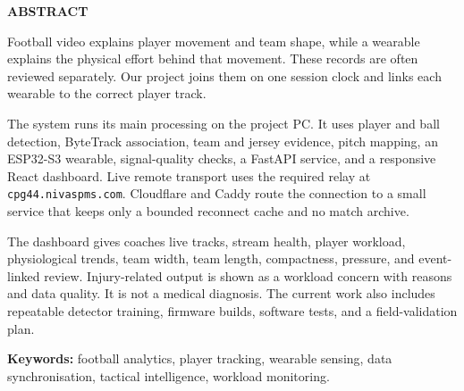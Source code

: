 \begin{center}
{\Large\textbf{ABSTRACT}}\\
\vspace{0.5cm}
\end{center}

Football video explains player movement and team shape, while a wearable
explains the physical effort behind that movement. These records are often
reviewed separately. Our project joins them on one session clock and links each
wearable to the correct player track.

The system runs its main processing on the project PC. It uses player and ball
detection, ByteTrack association, team and jersey evidence, pitch mapping, an
ESP32-S3 wearable, signal-quality checks, a FastAPI service, and a responsive
React dashboard. Live remote transport uses the required relay at
\texttt{cpg44.nivaspms.com}. Cloudflare and Caddy route the connection to a
small service that keeps only a bounded reconnect cache and no match archive.

The dashboard gives coaches live tracks, stream health, player workload,
physiological trends, team width, team length, compactness, pressure, and
event-linked review. Injury-related output is shown as a workload concern with
reasons and data quality. It is not a medical diagnosis. The current work also
includes repeatable detector training, firmware builds, software tests, and a
field-validation plan.

\noindent\textbf{Keywords:} football analytics, player tracking, wearable
sensing, data synchronisation, tactical intelligence, workload monitoring.
\clearpage
